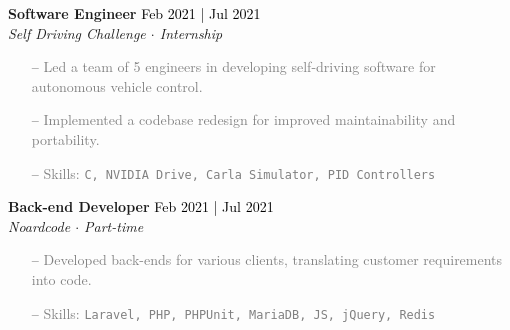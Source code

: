 \documentclass[a4paper]{article}
\begin{document}
\textbf{Software Engineer} \hfill \textcolor{black}{Feb 2021 | Jul 2021}\\
\textit{Self Driving Challenge $\cdot$ Internship}\\
\vspace{-1mm}
\begin{itemize} \itemsep 1pt
    \item[--] \textcolor{gray}{Led a team of 5 engineers in developing self-driving software for autonomous vehicle control.}
    \item[--] \textcolor{gray}{Implemented a codebase redesign for improved maintainability and portability.}
	\item[--] \textcolor{gray}{Skills: \texttt{C\scalebox{0.7}{++}, NVIDIA Drive, Carla Simulator, PID Controllers}}
\end{itemize}


\textbf{Back-end Developer} \hfill \textcolor{black}{Feb 2021 | Jul 2021}\\
\textit{Noardcode $\cdot$ Part-time}\\
\vspace{-1mm}
\begin{itemize} \itemsep 1pt
    \item[--] \textcolor{gray}{Developed back-ends for various clients, translating customer requirements into code.}

	\item[--] \textcolor{gray}{Skills: \texttt{Laravel, PHP, PHPUnit, MariaDB, JS, jQuery, Redis}}
\end{itemize}
\end{document}

